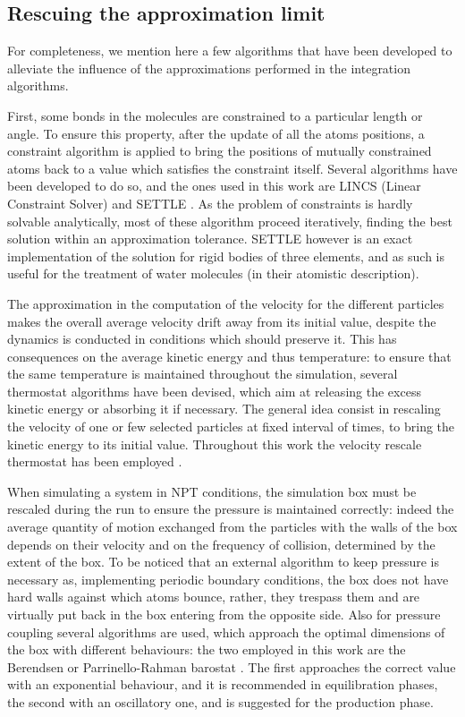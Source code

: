 \subsection{Rescuing the approximation limit}
For completeness, we mention here a few algorithms that have been developed to alleviate the influence of the approximations performed in the integration algorithms.

First, some bonds in the molecules are constrained to a particular length or angle. To ensure this property, after the update of all the atoms positions, a constraint algorithm is applied to bring the positions of mutually constrained atoms back to a value which satisfies the constraint itself. Several algorithms have been developed to do so, and the ones used in this work are LINCS (Linear Constraint Solver) \cite{Hess1997} and SETTLE \cite{Miyamoto1992}. As the problem of constraints is hardly solvable analytically, most of these algorithm proceed iteratively, finding the best solution within an approximation tolerance. SETTLE however is an exact implementation of the solution for rigid bodies of three elements, and as such is useful for the treatment of water molecules (in their atomistic description).

The approximation in the computation of the velocity for the different particles makes the overall average velocity drift away from its initial value, despite the dynamics is conducted in conditions which should preserve it. This has consequences on the average kinetic energy and thus temperature: to ensure that the same temperature is maintained throughout the simulation, several thermostat algorithms have been devised, which aim at releasing the excess kinetic energy or absorbing it if necessary. The general idea consist in rescaling the velocity of one or few selected particles at fixed interval of times, to bring the kinetic energy to its initial value. Throughout this work the velocity rescale thermostat has been employed \cite{Bussi2007}.

When simulating a system in NPT conditions, the simulation box must be rescaled during the run to ensure the pressure is maintained correctly: indeed the average quantity of motion exchanged from the particles with the walls of the box depends on their velocity and on the frequency of collision, determined by the extent of the box. To be noticed that an external algorithm to keep pressure is necessary as, implementing periodic boundary conditions, the box does not have hard walls against which atoms bounce, rather, they trespass them and are virtually put back in the box entering from the opposite side. Also for pressure coupling several algorithms are used, which approach the optimal dimensions of the box with different behaviours: the two employed in this work are the Berendsen \cite{Berendsen1984} or Parrinello-Rahman barostat \cite{Parrinello1981}. The first approaches the correct value with an exponential behaviour, and it is recommended in equilibration phases, the second with an oscillatory one, and is suggested for the production phase.

